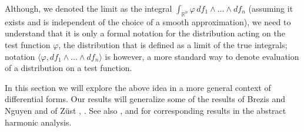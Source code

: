 \documentclass[intlimits,12pt,reqno]{amsart}
\newcommand{\R}{\mathbb R}
\numberwithin{equation}{section}
\theoremstyle{definition}
\begin{document}
Although, we denoted the limit as the integral $\int_{\R^n} \varphi\, df_1\wedge\ldots\wedge df_n$ (assuming it exists and is independent of the choice of a smooth approximation), we need to understand that it is only a formal notation for the distribution acting on the test function $\varphi$, the distribution that is defined as a limit of the true integrals; notation 
$\langle\varphi,df_1\wedge\ldots\wedge df_n\rangle$ is however, a more standard way to denote evaluation of a distribution on a test function. 

In this section we will explore the above idea
in a more general context of differential forms. Our results will generalize some of the results of Brezis and Nguyen  \cite[Theorem~3 and Corollary~1]{brezisn1} and of Z\"ust \cite[Theorem~3.2]{zust1}, \cite{zust2}. See also \cite{Conti}, and \cite{SY1999,LS19} for corresponding results in the abstract harmonic analysis.
\end{document}
